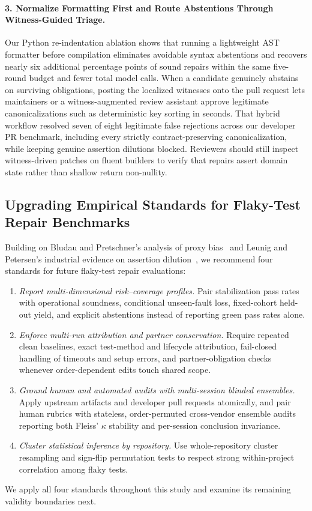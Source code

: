 \paragraph{3. Normalize Formatting First and Route Abstentions Through Witness-Guided Triage.}
Our Python re-indentation ablation shows that running a lightweight AST formatter before compilation eliminates avoidable syntax abstentions and recovers nearly six additional percentage points of sound repairs within the same five-round budget and fewer total model calls. When a candidate genuinely abstains on surviving obligations, posting the localized witnesses onto the pull request lets maintainers or a witness-augmented review assistant approve legitimate canonicalizations such as deterministic key sorting in seconds. That hybrid workflow resolved seven of eight legitimate false rejections across our developer PR benchmark, including every strictly contract-preserving canonicalization, while keeping genuine assertion dilutions blocked. Reviewers should still inspect witness-driven patches on fluent builders to verify that repairs assert domain state rather than shallow return non-nullity.

\subsection{Upgrading Empirical Standards for Flaky-Test Repair Benchmarks}

Building on Bludau and Pretschner's analysis of proxy bias~\cite{bludau2026szz} and Leunig and Petersen's industrial evidence on assertion dilution~\cite{leunig2026perl}, we recommend four standards for future flaky-test repair evaluations:
\begin{enumerate}[nosep]
    \item \emph{Report multi-dimensional risk--coverage profiles.} Pair stabilization pass rates with operational soundness, conditional unseen-fault loss, fixed-cohort held-out yield, and explicit abstentions instead of reporting green pass rates alone.
    \item \emph{Enforce multi-run attribution and partner conservation.} Require repeated clean baselines, exact test-method and lifecycle attribution, fail-closed handling of timeouts and setup errors, and partner-obligation checks whenever order-dependent edits touch shared scope.
    \item \emph{Ground human and automated audits with multi-session blinded ensembles.} Apply upstream artifacts and developer pull requests atomically, and pair human rubrics with stateless, order-permuted cross-vendor ensemble audits reporting both Fleiss' $\kappa$ stability and per-session conclusion invariance.
    \item \emph{Cluster statistical inference by repository.} Use whole-repository cluster resampling and sign-flip permutation tests to respect strong within-project correlation among flaky tests.
\end{enumerate}

We apply all four standards throughout this study and examine its remaining validity boundaries next.
